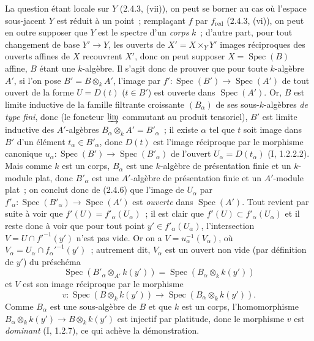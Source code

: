 La question étant locale sur $Y$ (2.4.3, (vii)), on peut se borner au cas où
l'espace sous-jacent $Y$ est réduit à un point~; remplaçant $f$ par
$f_{\mathrm{red}}$ (2.4.3, (vi)), on peut en outre supposer que $Y$ est le
spectre d'un \emph{corps} $k$~; d'autre part, pour tout changement de base
$Y'\to Y$, les ouverts de $X'=X\times_Y Y'$ images réciproques des ouverts
affines de $X$ recouvrent $X'$, donc on peut supposer
$X=\operatorname{Spec}(B)$ affine, $B$ étant une $k$-algèbre. Il s'agit donc
de prouver que pour toute $k$-algèbre $A'$, si l'on pose
$B'=B\otimes_k A'$, l'image par
$f':\operatorname{Spec}(B')\to\operatorname{Spec}(A')$ de tout ouvert de la
forme $U=D(t)$ ($t\in B'$) est ouverte dans $\operatorname{Spec}(A')$. Or,
$B$ est limite inductive de la famille filtrante croissante $(B_\alpha)$ de
ses sous-$k$-algèbres \emph{de type fini}, donc (le foncteur
$\varinjlim$ commutant au produit tensoriel), $B'$ est limite inductive des
$A'$-algèbres $B_\alpha\otimes_k A'=B'_\alpha$~; il existe $\alpha$ tel que
$t$ soit image dans $B'$ d'un élément $t_\alpha\in B'_\alpha$, donc $D(t)$
est l'image réciproque par le morphisme canonique
$u_\alpha:\operatorname{Spec}(B')\to\operatorname{Spec}(B'_\alpha)$ de
l'ouvert $U_\alpha=D(t_\alpha)$ (I, 1.2.2.2). Mais comme $k$ est un corps,
$B_\alpha$ est une $k$-algèbre de présentation finie et un $k$-module plat,
donc $B'_\alpha$ est une $A'$-algèbre de présentation finie et un $A'$-module
plat~; on conclut donc de (2.4.6) que l'image de $U_\alpha$ par
$f'_\alpha:\operatorname{Spec}(B'_\alpha)\to\operatorname{Spec}(A')$ est
\emph{ouverte} dans $\operatorname{Spec}(A')$. Tout revient par suite à voir
que $f'(U)=f'_\alpha(U_\alpha)$~; il est clair que
$f'(U)\subset f'_\alpha(U_\alpha)$ et il reste donc à voir que pour tout point
$y'\in f'_\alpha(U_\alpha)$, l'intersection
$V=U\cap f'^{-1}(y')$ n'est pas vide. Or on a
$V=u_\alpha^{-1}(V_\alpha)$, où
$V_\alpha=U_\alpha\cap f_\alpha'^{-1}(y')$~; autrement dit, $V_\alpha$ est
un ouvert non vide (par définition de $y'$) du préschéma
\[
\operatorname{Spec}(B'_\alpha\otimes_{A'}k(y'))
=\operatorname{Spec}(B_\alpha\otimes_k k(y'))
\]
et $V$ est son image réciproque par le morphisme
\[
v:\operatorname{Spec}(B\otimes_k k(y'))
\longrightarrow\operatorname{Spec}(B_\alpha\otimes_k k(y')).
\]
Comme $B_\alpha$ est une sous-algèbre de $B$ et que $k$ est un corps,
l'homomorphisme
$B_\alpha\otimes_k k(y')\to B\otimes_k k(y')$
est injectif par platitude, donc le morphisme $v$ est \emph{dominant}
(I, 1.2.7), ce qui achève la démonstration.

